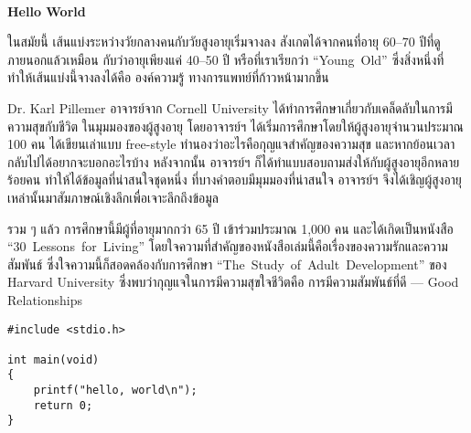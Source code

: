 \documentclass{article}
\begin{document}
\flushleft

\begin{Huge}
\rule{0em}{4ex}\\
\noindent\textbf{%
Hello World}
\vspace{3ex}
\end{Huge}

ในสมัยนี้ เส้นแบ่งระหว่างวัยกลางคนกับวัยสูงอายุเริ่มจางลง สังเกตได้จากคนที่อายุ 60--70 ปีที่ดูภายนอกแล้วเหมือน
กับว่าอายุเพียงแค่ 40--50 ปี หรือที่เราเรียกว่า \mbox{``Young Old''} ซึ่งสิ่งหนึ่งที่ทำให้เส้นแบ่งนี้จางลงได้คือ องค์ความรู้
ทางการแพทย์ที่ก้าวหน้ามากขึ้น

\rule{0em}{1ex}

Dr. Karl Pillemer อาจารย์จาก Cornell University ได้ทำการศึกษาเกี่ยวกับเคล็ดลับในการมีความสุขกับชีวิต
ในมุมมองของผู้สูงอายุ โดยอาจารย์ฯ ได้เริ่มการศึกษาโดยให้ผู้สูงอายุจำนวนประมาณ 100 คน ได้เขียนเล่าแบบ
free-style ทำนองว่าอะไรคือกุญแจสำคัญของความสุข และหากย้อนเวลากลับไปได้อยากจะบอกอะไรบ้าง
หลังจากนั้น อาจารย์ฯ ก็ได้ทำแบบสอบถามส่งให้กับผู้สูงอายุอีกหลายร้อยคน ทำให้ได้ข้อมูลที่น่าสนใจชุดหนึ่ง
ที่บางคำตอบมีมุมมองที่น่าสนใจ อาจารย์ฯ จึงได้เชิญผู้สูงอายุเหล่านั้นมาสัมภาษณ์เชิงลึกเพื่อเจาะลึกถึงข้อมูล

\rule{0em}{1ex}

รวม ๆ แล้ว การศึกษานี้มีผู้ที่อายุมากกว่า 65 ปี เข้าร่วมประมาณ 1,000 คน และได้เกิดเป็นหนังสือ
\mbox{``30 Lessons for Living''} โดยใจความที่สำคัญของหนังสือเล่มนี้คือเรื่องของความรักและความสัมพันธ์
ซึ่งใจความนี้ก็สอดคล้องกับการศึกษา \mbox{``The Study of Adult Development''} ของ Harvard University
ซึ่งพบว่ากุญแจในการมีความสุขใจชีวิตคือ การมีความสัมพันธ์ที่ดี --- Good Relationships

% 

\begin{verbatim}
#include <stdio.h>

int main(void)
{
    printf("hello, world\n");
    return 0;
}
\end{verbatim}
\end{document}
